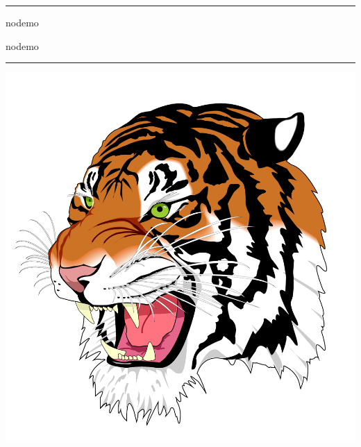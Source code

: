 \documentclass[a4paper,\myClassOptions]{article}
\begin{document}
\hrule
\begin{description}
  \Large
  \item[graphicx:] nodemo
  \item[pdfpages:] nodemo
\end{description}
\hrule

\tableofcontents
\includegraphics[scale=.4]{pdf/tiger.pdf}


\end{document}
